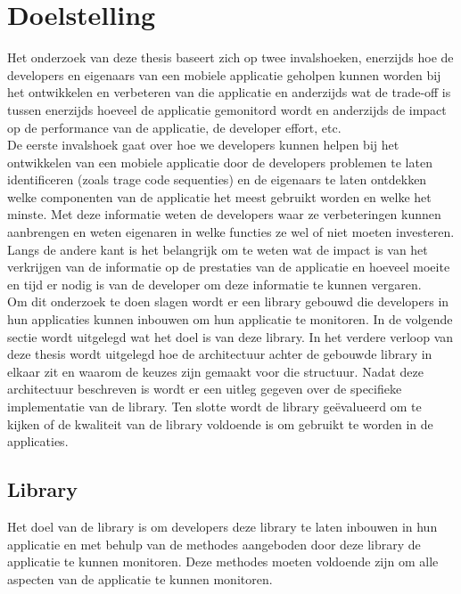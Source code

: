 \chapter{Doelstelling} \label{doelstelling}
Het onderzoek van deze thesis baseert zich op twee invalshoeken, enerzijds hoe de developers en eigenaars van een mobiele applicatie geholpen kunnen worden bij het ontwikkelen en verbeteren van die applicatie en anderzijds wat de trade-off is tussen enerzijds hoeveel de applicatie gemonitord wordt en anderzijds de impact op de performance van de applicatie, de developer effort, etc. \\

De eerste invalshoek gaat over hoe we developers kunnen helpen bij het ontwikkelen van een mobiele applicatie door de developers problemen te laten identificeren (zoals trage code sequenties) en de eigenaars te laten ontdekken welke componenten van de applicatie het meest gebruikt worden en welke het minste. Met deze informatie weten de developers waar ze verbeteringen kunnen aanbrengen en weten eigenaren in welke functies ze wel of niet moeten investeren. Langs de andere kant is het belangrijk om te weten wat de impact is van het verkrijgen van de informatie op de prestaties van de applicatie en hoeveel moeite en tijd er nodig is van de developer om deze informatie te kunnen vergaren.\\


Om dit onderzoek te doen slagen wordt er een library gebouwd die developers in hun applicaties kunnen inbouwen om hun applicatie te monitoren. In de volgende sectie wordt uitgelegd wat het doel is van deze library. In het verdere verloop van deze thesis wordt uitgelegd hoe de architectuur achter de gebouwde library in elkaar zit en waarom de keuzes zijn gemaakt voor die structuur. Nadat deze architectuur beschreven is wordt er een uitleg gegeven over de specifieke implementatie van de library. Ten slotte wordt de library ge\"evalueerd om te kijken of de kwaliteit van de library voldoende is om gebruikt te worden in de applicaties. 

\section{Library}
Het doel van de library is om developers deze library te laten inbouwen in hun applicatie en met behulp van de methodes aangeboden door deze library de applicatie te kunnen monitoren. Deze methodes moeten voldoende zijn om alle aspecten van de applicatie te kunnen monitoren. \\

